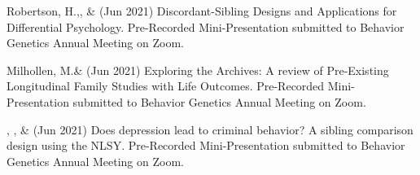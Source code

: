
\item Robertson, H.,\noteA \Joe, \&  \meb (Jun 2021) Discordant-Sibling Designs and Applications for Differential Psychology. Pre-Recorded Mini-Presentation submitted to Behavior Genetics Annual Meeting on Zoom.

\item Milhollen, M.\noteA \&  \meb (Jun 2021) Exploring the Archives: A review of Pre-Existing Longitudinal Family Studies with Life Outcomes. Pre-Recorded Mini-Presentation submitted to Behavior Genetics Annual Meeting on Zoom.

\item \emsims, \jt,  \&  \meb (Jun 2021) Does depression lead to criminal behavior? A sibling comparison design using the NLSY. Pre-Recorded Mini-Presentation submitted to Behavior Genetics Annual Meeting on Zoom.


